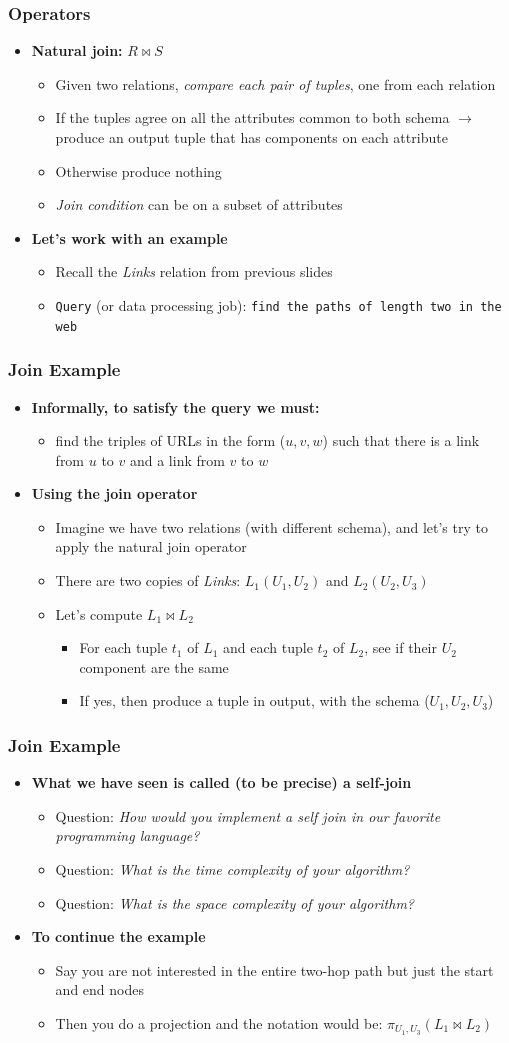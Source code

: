 \documentclass{beamer}
\newcommand{\bi}{\begin{itemize}}
\newcommand{\ei}{\end{itemize}}
\newcommand{\ii}{\item}
\newcommand*{\myblue}[1]{\textcolor{myblue}{#1}}
\newcommand*{\myred}[1]{\textcolor{myred}{#1}}
\newcommand{\project}{\pi}
\newcommand{\join}{\Join}
\begin{document}


\begin{frame}
\frametitle{Operators}
\bi
\ii \textbf{Natural join:} $R \join S$
\bi
\ii Given two relations, \textit{compare each pair of tuples}, one from each relation
\ii If the tuples agree on all the attributes common to both schema $\rightarrow$ produce an output tuple that has components on each attribute
\ii Otherwise produce nothing
\ii \myred{\textit{Join condition}} can be on a subset of attributes
\ei
\ei
\bi
\ii \textbf{Let's work with an example} 
\bi
\ii Recall the \textit{Links} relation from previous slides
\ii \texttt{Query} (or data processing job): \texttt{find the paths of length two in the web}
\ei
\ei
\end{frame}



\begin{frame}
\frametitle{Join Example}
\bi
\ii \textbf{Informally, to satisfy the query we must:} 
\bi
\ii find the triples of URLs in the form ($u, v, w$) such that there is a link from $u$ to $v$ and a link from $v$ to $w$
\ei
\ei
\bi
\ii \textbf{Using the join operator} 
\bi
\ii Imagine we have two relations (with different schema), and let's try to apply the natural join operator
\ii There are two copies of \textit{Links}: $L_1(U_1, U_2)$ and $L_2(U_2, U_3)$
\ii Let's compute $L_1 \join L_2$
\bi
\ii For each tuple $t_1$ of $L_1$ and each tuple $t_2$ of $L_2$, see if their $U_2$ component are the same
\ii If yes, then produce a tuple in output, with the schema ($U_1, U_2, U_3$)
\ei
\ei
\ei
\end{frame}



\begin{frame}
\frametitle{Join Example}
\bi
\ii \textbf{What we have seen is called (to be precise) a \myblue{self-join}} 
\bi
\ii \myred{Question:} \textit{How would you implement a self join in our favorite programming language?}
\ii \myred{Question:} \textit{What is the time complexity of your algorithm?}
\ii \myred{Question:} \textit{What is the space complexity of your algorithm?}
\ei
\ei
\bi
\ii \textbf{To continue the example} 
\bi
\ii Say you are not interested in the entire two-hop path but just the start and end nodes
\ii Then you do a projection and the notation would be: $\project_{U_1, U_3}(L_1 \join L_2)$
\ei
\ei
\end{frame}
\end{document}
